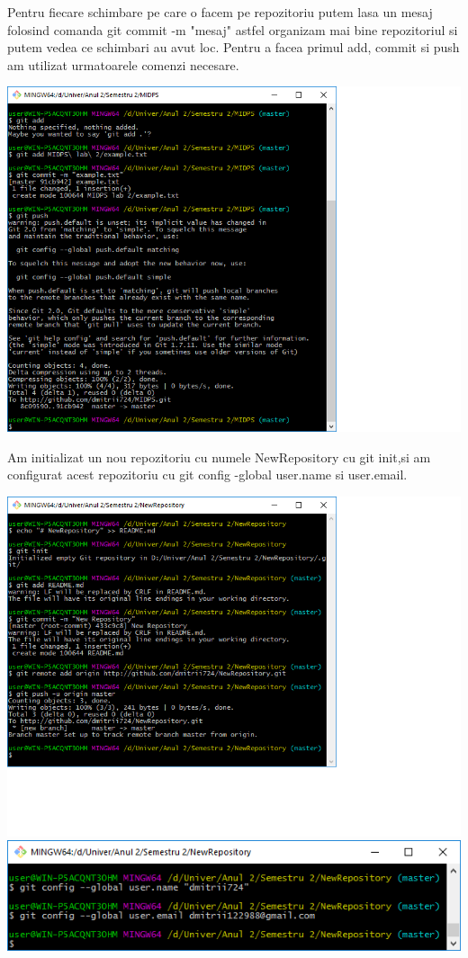 Pentru fiecare schimbare pe care o facem pe repozitoriu putem lasa un mesaj folosind comanda git commit -m "mesaj" astfel organizam mai bine repozitoriul si putem vedea  ce schimbari au avut loc. Pentru a facea primul add, commit si push am utilizat urmatoarele comenzi necesare.\\
\begin{center}
\includegraphics[scale=0.75]{images/4}\\
\end{center}

Am initializat un nou repozitoriu cu numele NewRepository cu git init,si am configurat acest repozitoriu cu git config \--global user.name si user.email.\\
\begin{center}
\includegraphics[scale=0.75]{images/5}\\
\includegraphics[scale=0.75]{images/6}\\
\end{center}

